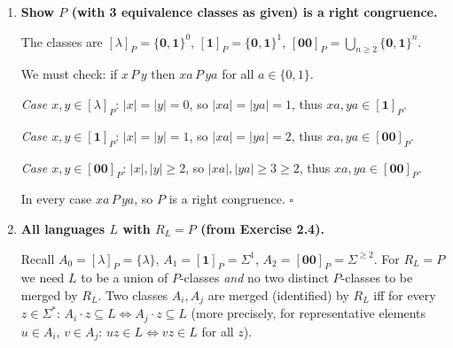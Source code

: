 \begin{enumerate}[{2.}1.]
\textit{Justification}: If $L\neq\emptyset$ and $L\neq\Sigma^*$, pick $w\in L$ and $u\notin L$. Then $w\,R_L\,u$ fails (take $z=\lambda$), so $R_L$ has at least 2 classes.

\item \textbf{Show $P$ (with 3 equivalence classes as given) is a right congruence.}

The classes are $[\lambda]_P=\{\mathbf{0},\mathbf{1}\}^0$, $[\mathbf{1}]_P=\{\mathbf{0},\mathbf{1}\}^1$, $[\mathbf{00}]_P=\bigcup_{n\geq 2}\{\mathbf{0},\mathbf{1}\}^n$.

We must check: if $x\,P\,y$ then $xa\,P\,ya$ for all $a\in\{0,1\}$.

\textit{Case $x,y\in[\lambda]_P$}: $|x|=|y|=0$, so $|xa|=|ya|=1$, thus $xa,ya\in[\mathbf{1}]_P$.

\textit{Case $x,y\in[\mathbf{1}]_P$}: $|x|=|y|=1$, so $|xa|=|ya|=2$, thus $xa,ya\in[\mathbf{00}]_P$.

\textit{Case $x,y\in[\mathbf{00}]_P$}: $|x|,|y|\geq 2$, so $|xa|,|ya|\geq 3\geq 2$, thus $xa,ya\in[\mathbf{00}]_P$.

In every case $xa\,P\,ya$, so $P$ is a right congruence. $\square$

\item \textbf{All languages $L$ with $R_L=P$ (from Exercise 2.4).}

Recall $A_0=[\lambda]_P=\{\lambda\}$, $A_1=[\mathbf{1}]_P=\Sigma^1$, $A_2=[\mathbf{00}]_P=\Sigma^{\geq 2}$.
For $R_L=P$ we need $L$ to be a union of $P$-classes \emph{and} no two distinct $P$-classes to be merged by $R_L$.
Two classes $A_i, A_j$ are merged (identified) by $R_L$ iff for every $z\in\Sigma^*$: $A_i\cdot z \subseteq L \Leftrightarrow A_j\cdot z\subseteq L$ (more precisely, for representative elements $u\in A_i$, $v\in A_j$: $uz\in L\Leftrightarrow vz\in L$ for all $z$).


\end{enumerate}
